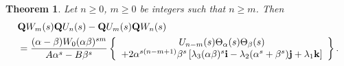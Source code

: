 \documentclass{kms-c}
\theoremstyle{plain}
\newtheorem{theorem}{Theorem}[section]
\theoremstyle{definition}
\theoremstyle{remark}
\begin{document}
\begin{theorem}\label{t8}
Let $n\geq 0$, $m\geq 0$ be integers such that $n\geq m$. Then
\begin{align*}
&\textnormal{\textbf{Q}}W_{m}(s)\textnormal{\textbf{Q}}U_{n}(s)-\textnormal{\textbf{Q}}U_{m}(s)\textnormal{\textbf{Q}}W_{n}(s)\\
&=\frac{(\alpha-\beta)W_{0}(\alpha\beta)^{sm}}{A\alpha^{s}-B\beta^{s}}\left\lbrace \begin{array}{c} 
U_{n-m}(s)\Theta_{\alpha}(s)\Theta_{\beta}(s)\\
+2\alpha^{s(n-m+1)}\beta^{s}\left[\lambda_{3}(\alpha\beta)^{s}\textnormal{\textbf{i}}-\lambda_{2}(\alpha^{s}+\beta^{s})\textnormal{\textbf{j}}+\lambda_{1}\textnormal{\textbf{k}}\right]
\end{array}\right\rbrace .
\end{align*}
\end{theorem}
\end{document}
